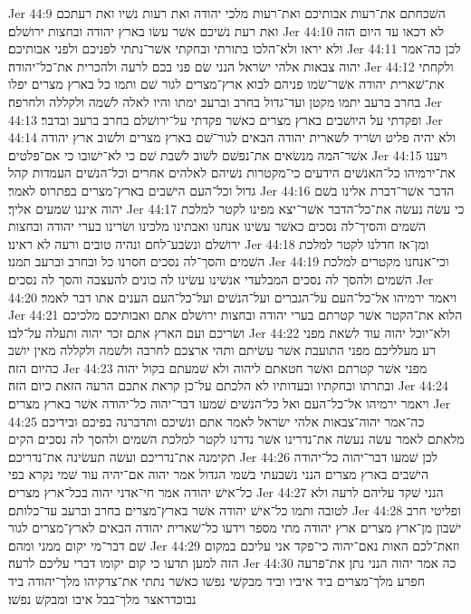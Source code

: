 Jer 44:9  השׁכחתם את־רעות אבותיכם ואת־רעות מלכי יהודה ואת רעות נשׁיו ואת רעתכם ואת רעת נשׁיכם אשׁר עשׂו בארץ יהודה ובחצות ירושׁלם׃
Jer 44:10  לא דכאו עד היום הזה ולא יראו ולא־הלכו בתורתי ובחקתי אשׁר־נתתי לפניכם ולפני אבותיכם׃
Jer 44:11  לכן כה־אמר יהוה צבאות אלהי ישׂראל הנני שׂם פני בכם לרעה ולהכרית את־כל־יהודה׃
Jer 44:12  ולקחתי את־שׁארית יהודה אשׁר־שׂמו פניהם לבוא ארץ־מצרים לגור שׁם ותמו כל בארץ מצרים יפלו בחרב ברעב יתמו מקטן ועד־גדול בחרב וברעב ימתו והיו לאלה לשׁמה ולקללה ולחרפה׃
Jer 44:13  ופקדתי על היושׁבים בארץ מצרים כאשׁר פקדתי על־ירושׁלם בחרב ברעב ובדבר׃
Jer 44:14  ולא יהיה פליט ושׂריד לשׁארית יהודה הבאים לגור־שׁם בארץ מצרים ולשׁוב ארץ יהודה אשׁר־המה מנשׂאים את־נפשׁם לשׁוב לשׁבת שׁם כי לא־ישׁובו כי אם־פלטים׃
Jer 44:15  ויענו את־ירמיהו כל־האנשׁים הידעים כי־מקטרות נשׁיהם לאלהים אחרים וכל־הנשׁים העמדות קהל גדול וכל־העם הישׁבים בארץ־מצרים בפתרוס לאמר׃
Jer 44:16  הדבר אשׁר־דברת אלינו בשׁם יהוה איננו שׁמעים אליך׃
Jer 44:17  כי עשׂה נעשׂה את־כל־הדבר אשׁר־יצא מפינו לקטר למלכת השׁמים והסיך־לה נסכים כאשׁר עשׂינו אנחנו ואבתינו מלכינו ושׂרינו בערי יהודה ובחצות ירושׁלם ונשׂבע־לחם ונהיה טובים ורעה לא ראינו׃
Jer 44:18  ומן־אז חדלנו לקטר למלכת השׁמים והסך־לה נסכים חסרנו כל ובחרב וברעב תמנו׃
Jer 44:19  וכי־אנחנו מקטרים למלכת השׁמים ולהסך לה נסכים המבלעדי אנשׁינו עשׂינו לה כונים להעצבה והסך לה נסכים׃
Jer 44:20  ויאמר ירמיהו אל־כל־העם על־הגברים ועל־הנשׁים ועל־כל־העם הענים אתו דבר לאמר׃
Jer 44:21  הלוא את־הקטר אשׁר קטרתם בערי יהודה ובחצות ירושׁלם אתם ואבותיכם מלכיכם ושׂריכם ועם הארץ אתם זכר יהוה ותעלה על־לבו׃
Jer 44:22  ולא־יוכל יהוה עוד לשׂאת מפני רע מעלליכם מפני התועבת אשׁר עשׂיתם ותהי ארצכם לחרבה ולשׁמה ולקללה מאין יושׁב כהיום הזה׃
Jer 44:23  מפני אשׁר קטרתם ואשׁר חטאתם ליהוה ולא שׁמעתם בקול יהוה ובתרתו ובחקתיו ובעדותיו לא הלכתם על־כן קראת אתכם הרעה הזאת כיום הזה׃
Jer 44:24  ויאמר ירמיהו אל־כל־העם ואל כל־הנשׁים שׁמעו דבר־יהוה כל־יהודה אשׁר בארץ מצרים׃
Jer 44:25  כה־אמר יהוה־צבאות אלהי ישׂראל לאמר אתם ונשׁיכם ותדברנה בפיכם ובידיכם מלאתם לאמר עשׂה נעשׂה את־נדרינו אשׁר נדרנו לקטר למלכת השׁמים ולהסך לה נסכים הקים תקימנה את־נדריכם ועשׂה תעשׂינה את־נדריכם׃
Jer 44:26  לכן שׁמעו דבר־יהוה כל־יהודה הישׁבים בארץ מצרים הנני נשׁבעתי בשׁמי הגדול אמר יהוה אם־יהיה עוד שׁמי נקרא בפי כל־אישׁ יהודה אמר חי־אדני יהוה בכל־ארץ מצרים׃
Jer 44:27  הנני שׁקד עליהם לרעה ולא לטובה ותמו כל־אישׁ יהודה אשׁר בארץ־מצרים בחרב וברעב עד־כלותם׃
Jer 44:28  ופליטי חרב ישׁבון מן־ארץ מצרים ארץ יהודה מתי מספר וידעו כל־שׁארית יהודה הבאים לארץ־מצרים לגור שׁם דבר־מי יקום ממני ומהם׃
Jer 44:29  וזאת־לכם האות נאם־יהוה כי־פקד אני עליכם במקום הזה למען תדעו כי קום יקומו דברי עליכם לרעה׃
Jer 44:30  כה אמר יהוה הנני נתן את־פרעה חפרע מלך־מצרים ביד איביו וביד מבקשׁי נפשׁו כאשׁר נתתי את־צדקיהו מלך־יהודה ביד נבוכדראצר מלך־בבל איבו ומבקשׁ נפשׁו׃
